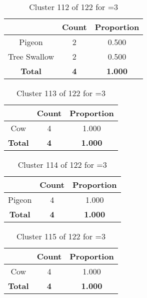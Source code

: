 \begin{table}[ht!]
\centering
\begin{tabular}{|c|c|c|}
\hline
\bf \Spec{} &\bf Count &\bf Proportion\\ \hline \hline
Pigeon & 2 & 0.500\\ \hline
Tree Swallow & 2 & 0.500\\ \hline
\hline
\bf Total & \bf 4 & \bf 1.000\\ \hline
\end{tabular}
\label{tab:cluster:112:3}
\caption{Cluster 112 of 122 for \minneigh{}=3}
\end{table}

\begin{table}[ht!]
\centering
\begin{tabular}{|c|c|c|}
\hline
\bf \Spec{} &\bf Count &\bf Proportion\\ \hline \hline
Cow & 4 & 1.000\\ \hline
\hline
\bf Total & \bf 4 & \bf 1.000\\ \hline
\end{tabular}
\label{tab:cluster:113:3}
\caption{Cluster 113 of 122 for \minneigh{}=3}
\end{table}

\begin{table}[ht!]
\centering
\begin{tabular}{|c|c|c|}
\hline
\bf \Spec{} &\bf Count &\bf Proportion\\ \hline \hline
Pigeon & 4 & 1.000\\ \hline
\hline
\bf Total & \bf 4 & \bf 1.000\\ \hline
\end{tabular}
\label{tab:cluster:114:3}
\caption{Cluster 114 of 122 for \minneigh{}=3}
\end{table}

\begin{table}[ht!]
\centering
\begin{tabular}{|c|c|c|}
\hline
\bf \Spec{} &\bf Count &\bf Proportion\\ \hline \hline
Cow & 4 & 1.000\\ \hline
\hline
\bf Total & \bf 4 & \bf 1.000\\ \hline
\end{tabular}
\label{tab:cluster:115:3}
\caption{Cluster 115 of 122 for \minneigh{}=3}
\end{table}

